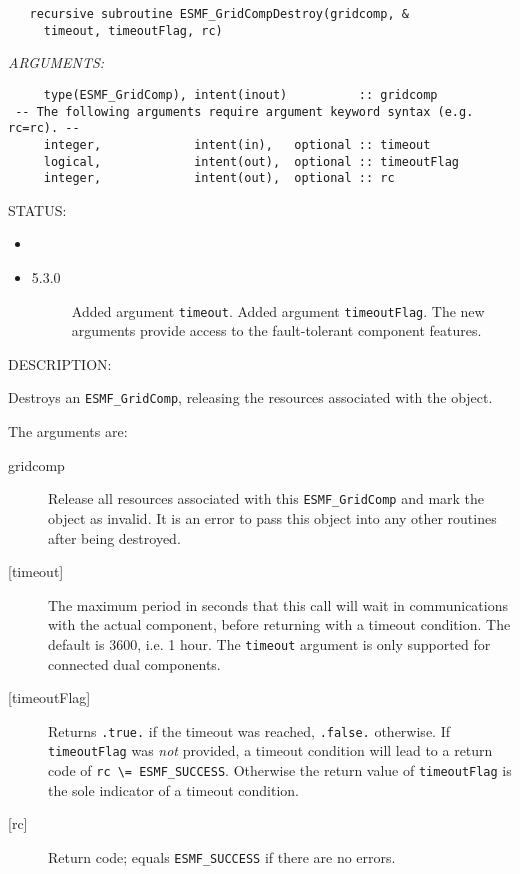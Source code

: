   
\begin{verbatim}   recursive subroutine ESMF_GridCompDestroy(gridcomp, &
     timeout, timeoutFlag, rc)\end{verbatim}{\em ARGUMENTS:}
\begin{verbatim}     type(ESMF_GridComp), intent(inout)          :: gridcomp
 -- The following arguments require argument keyword syntax (e.g. rc=rc). --
     integer,             intent(in),   optional :: timeout
     logical,             intent(out),  optional :: timeoutFlag
     integer,             intent(out),  optional :: rc\end{verbatim}
{\sf STATUS:}
   \begin{itemize}
   \item{}
   \item{}
   \begin{description}
   \item[5.3.0] Added argument {\tt timeout}.
                Added argument {\tt timeoutFlag}.
                The new arguments provide access to the fault-tolerant component
                features.
   \end{description}
   \end{itemize}
  
{\sf DESCRIPTION:\\ }


   Destroys an {\tt ESMF\_GridComp}, releasing the resources associated
   with the object.
  
   The arguments are:
   \begin{description}
   \item[gridcomp]
     Release all resources associated with this {\tt ESMF\_GridComp}
     and mark the object as invalid.  It is an error to pass this
     object into any other routines after being destroyed.
   \item[{[timeout]}]
     The maximum period in seconds that this call will wait in communications
     with the actual component, before returning with a timeout condition.
     The default is 3600, i.e. 1 hour. The {\tt timeout} argument is only
     supported for connected dual components.
   \item[{[timeoutFlag]}]
     Returns {\tt .true.} if the timeout was reached, {\tt .false.} otherwise.
     If {\tt timeoutFlag} was {\em not} provided, a timeout condition will lead
     to a return code of {\tt rc \textbackslash = ESMF\_SUCCESS}. Otherwise the
     return value of {\tt timeoutFlag} is the sole indicator of a timeout
     condition.
   \item[{[rc]}]
     Return code; equals {\tt ESMF\_SUCCESS} if there are no errors.
   \end{description}
   
